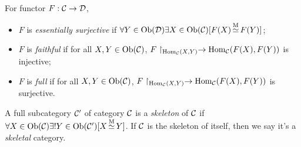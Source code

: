 \documentclass{article}
\begin{document}
\begin{defi}\label{different functors}
	For functor $F:\mathcal{C}\to\mathcal{D}$,
	\begin{itemize}
		\item $F$ is \emph{essentially surjective} if $\forall Y\in\mathrm{Ob}(\mathcal{D})\exists X\in\mathrm{Ob}(\mathcal{C})[F(X)\mathop{\simeq}\limits^\mathrm{M}F(Y)]$;
		\item $F$ is \emph{faithful} if for all $X,Y\in\mathrm{Ob}(\mathcal{C})$, $F\upharpoonright_{\mathrm{Hom}_{\mathcal{C}}(X,Y)}\to\mathrm{Hom}_{\mathcal{C}}(F(X),F(Y))$ is injective;
		\item $F$ is \emph{full} if for all $X,Y\in\mathrm{Ob}(\mathcal{C})$, $F\upharpoonright_{\mathrm{Hom}_{\mathcal{C}}(X,Y)}\to\mathrm{Hom}_{\mathcal{C}}(F(X),F(Y))$ is surjective.
	\end{itemize}
\end{defi}


\begin{defi}\label{skeleton}
	A full subcategory $\mathcal{C}'$ of category $\mathcal{C}$ is a \emph{skeleton} of $\mathcal{C}$ if $\forall X\in\mathrm{Ob}(\mathcal{C})\exists! Y\in\mathrm{Ob}(\mathcal{C}')[X\mathop{\simeq}\limits^\mathrm{M}Y]$. If $\mathcal{C}$ is the skeleton of itself, then we say it's a \emph{skeletal} category.
\end{defi}
\end{document}
